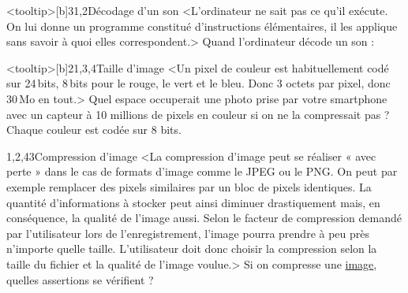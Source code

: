 \begin{quiz}[title={Infographie et audionumérique}]
\begin{quizquestion*}<tooltip>[b]{3}{1,2}{Décodage d'un son}
<L'ordinateur ne sait pas ce qu'il exécute. On lui donne un programme constitué d'instructions élémentaires, il les applique sans savoir à quoi elles correspondent.>
Quand l'ordinateur décode un son :
\end{quizquestion*}
\end{quiz}


\begin{quiz}[title={Compression de données}]
\begin{quizquestion*}<tooltip>[b]{2}{1,3,4}{Taille d'image}
<Un pixel de couleur est habituellement codé sur 24\,bits, 8\,bits pour le rouge, le vert et le bleu. Donc 3 octets par pixel, donc 30\,Mo en tout.>
Quel espace occuperait une photo prise par votre smartphone avec un capteur à 10 millions de pixels en couleur si on ne la compressait pas ? Chaque couleur est codée sur 8 bits.
\end{quizquestion*}

\vspace{-\baselineskip}
\begin{quizquestion}[b]{1,2,4}{3}{Compression d'image}
<La compression d'image peut se réaliser « avec perte » dans le cas de formats d'image comme le JPEG ou le PNG. On peut par exemple remplacer des pixels similaires par un bloc de pixels identiques. La quantité d'informations à stocker peut ainsi diminuer drastiquement mais, en conséquence, la qualité de l'image aussi.
Selon le facteur de compression demandé par l'utilisateur lors de l'enregistrement, l'image pourra prendre à peu près n'importe quelle taille. L'utilisateur doit donc choisir la compression selon la taille du fichier et la qualité de l'image voulue.>
Si on compresse une \href{https://www.fun-mooc.fr/asset-v1:inria+41018+session01+type@asset+block@Untitled.jpg}{image}, quelles assertions se vérifient ?
\parnotes
\end{quizquestion}


\end{quiz}
